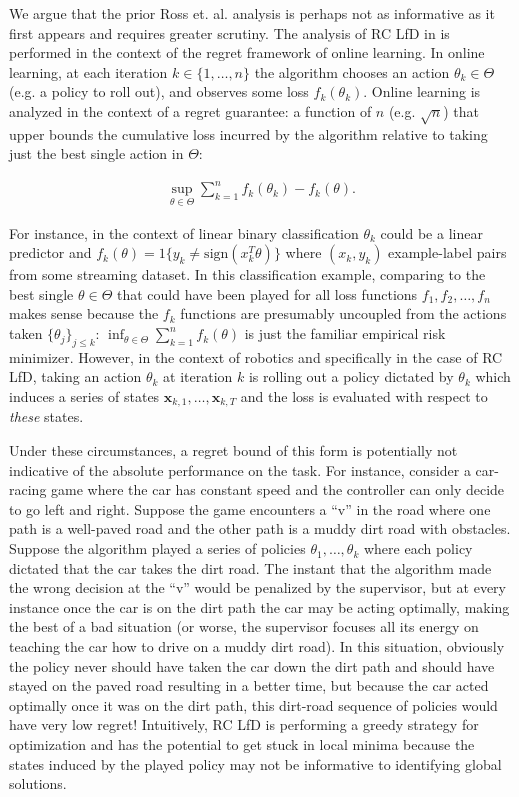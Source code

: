 \documentclass[10pt, conference]{ieeeconf}      %
\newcommand{\bx}{\mathbf{x}}
\begin{document}
We argue that the prior Ross et. al. analysis is perhaps not as informative as it first appears and requires greater scrutiny. 
The analysis of RC LfD in \cite{ross2010reduction} is performed in the context of the regret framework of online learning. 
In online learning, at each iteration $k \in \{1,\dots,n\}$ the algorithm chooses an action $\theta_k \in \Theta$ (e.g. a policy to roll out), and observes some loss $f_k(\theta_k)$. 
Online learning is analyzed in the context of a regret guarantee: a function of $n$ (e.g. $\sqrt{n}$) that upper bounds the cumulative loss incurred by the algorithm relative to taking just the best single action in $\Theta$:

\begin{align*}
\sup_{\theta \in \Theta} \sum_{k=1}^n f_k(\theta_k) - f_k(\theta).
\end{align*}

For instance, in the context of linear binary classification $\theta_k$ could be a linear predictor and $f_k(\theta)= 1\{ y_k \neq \text{sign}(x_k^T\theta) \}$ where $(x_k,y_k)$ example-label pairs from some streaming dataset. 
In this classification example, comparing to the best single $\theta \in \Theta$ that could have been played for all loss functions $f_1,f_2,\dots,f_n$ makes sense because the $f_k$ functions are presumably uncoupled from the actions taken $\{\theta_j\}_{j \leq k}$: $\inf_{\theta \in \Theta} \sum_{k=1}^n f_k(\theta)$ is just the familiar empirical risk minimizer. 
However, in the context of robotics and specifically in the case of RC LfD, taking an action $\theta_k$ at iteration $k$ is rolling out a policy dictated by $\theta_k$ which induces a series of states $\bx_{k,1},\dots,\bx_{k,T}$ and the loss is evaluated with respect to {\em these} states.  

Under these circumstances, a regret bound of this form is potentially not indicative of the absolute performance on the task.
For instance, consider a car-racing game where the car has constant speed and the controller can only decide to go left and right. Suppose the game encounters a ``v'' in the road where one path is a well-paved road and the other path is a muddy dirt road with obstacles. Suppose the algorithm played a series of policies $\theta_1,\dots,\theta_k$ where each policy dictated that the car takes the dirt road. The instant that the algorithm made the wrong decision at the ``v'' would be penalized by the supervisor, but at every instance once the car is on the dirt path the car may be acting optimally, making the best of a bad situation (or worse, the supervisor focuses all its energy on teaching the car how to drive on a muddy dirt road). In this situation, obviously the policy never should have taken the car down the dirt path and should have stayed on the paved road resulting in a better time, but because the car acted optimally once it was on the dirt path, this dirt-road sequence of policies would have very low regret!
Intuitively, RC LfD is performing a greedy strategy for optimization and has the potential to get stuck in local minima because the states induced by the played policy may not be informative to identifying global solutions.
\end{document}
